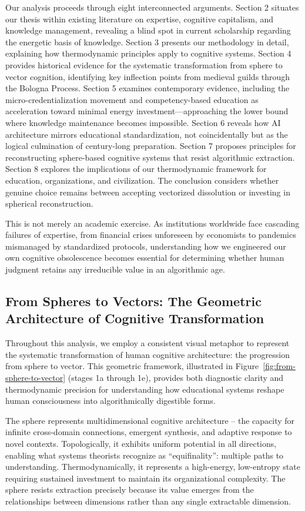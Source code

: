 Our analysis proceeds through eight interconnected arguments. Section 2 situates our thesis within existing literature on expertise, cognitive capitalism, and knowledge management, revealing a blind spot in current scholarship regarding the energetic basis of knowledge. Section 3 presents our methodology in detail, explaining how thermodynamic principles apply to cognitive systems. Section 4 provides historical evidence for the systematic transformation from sphere to vector cognition, identifying key inflection points from medieval guilds through the Bologna Process. Section 5 examines contemporary evidence, including the micro-credentialization movement and competency-based education as acceleration toward minimal energy investment—approaching the lower bound where knowledge maintenance becomes impossible. Section 6 reveals how AI architecture mirrors educational standardization, not coincidentally but as the logical culmination of century-long preparation. Section 7 proposes principles for reconstructing sphere-based cognitive systems that resist algorithmic extraction. Section 8 explores the implications of our thermodynamic framework for education, organizations, and civilization. The conclusion considers whether genuine choice remains between accepting vectorized dissolution or investing in spherical reconstruction.

This is not merely an academic exercise. As institutions worldwide face cascading failures of expertise, from financial crises unforeseen by economists to pandemics mismanaged by standardized protocols, understanding how we engineered our own cognitive obsolescence becomes essential for determining whether human judgment retains any irreducible value in an algorithmic age.

\subsection{From Spheres to Vectors: The Geometric Architecture of Cognitive Transformation}

Throughout this analysis, we employ a consistent visual metaphor to represent the systematic transformation of human cognitive architecture: the progression from sphere to vector. This geometric framework, illustrated in Figure~\ref{fig:from-sphere-to-vector} (stages 1a through 1e), provides both diagnostic clarity and thermodynamic precision for understanding how educational systems reshape human consciousness into algorithmically digestible forms.

The sphere represents multidimensional cognitive architecture – the capacity for infinite cross-domain connections, emergent synthesis, and adaptive response to novel contexts. Topologically, it exhibits uniform potential in all directions, enabling what systems theorists recognize as ``equifinality'': multiple paths to understanding. Thermodynamically, it represents a high-energy, low-entropy state requiring sustained investment to maintain its organizational complexity. The sphere resists extraction precisely because its value emerges from the relationships between dimensions rather than any single extractable dimension.

